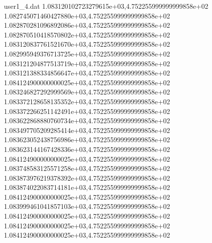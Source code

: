 \begin{filecontents}{user1_4.dat}
1.083120102723279615e+03,4.752255999999999858e+02
1.082745071460427880e+03,4.752255999999999858e+02
1.082870281096892086e+03,4.752255999999999858e+02
1.082870510418570802e+03,4.752255999999999858e+02
1.083120837761521670e+03,4.752255999999999858e+02
1.082995949376713725e+03,4.752255999999999858e+02
1.083121204877513719e+03,4.752255999999999858e+02
1.083121388334856647e+03,4.752255999999999858e+02
1.084124900000000025e+03,4.752255999999999858e+02
1.083246827292999569e+03,4.752255999999999858e+02
1.083372128658135352e+03,4.752255999999999858e+02
1.083372266251142491e+03,4.752255999999999858e+02
1.083622868880760734e+03,4.752255999999999858e+02
1.083497705209285414e+03,4.752255999999999858e+02
1.083623052438756986e+03,4.752255999999999858e+02
1.083623144167428336e+03,4.752255999999999858e+02
1.084124900000000025e+03,4.752255999999999858e+02
1.083748583125571258e+03,4.752255999999999858e+02
1.083873976219378392e+03,4.752255999999999858e+02
1.083874022083714181e+03,4.752255999999999858e+02
1.084124900000000025e+03,4.752255999999999858e+02
1.083999461041857103e+03,4.752255999999999858e+02
1.084124900000000025e+03,4.752255999999999858e+02
1.084124900000000025e+03,4.752255999999999858e+02
1.084124900000000025e+03,4.752255999999999858e+02
\end{filecontents}